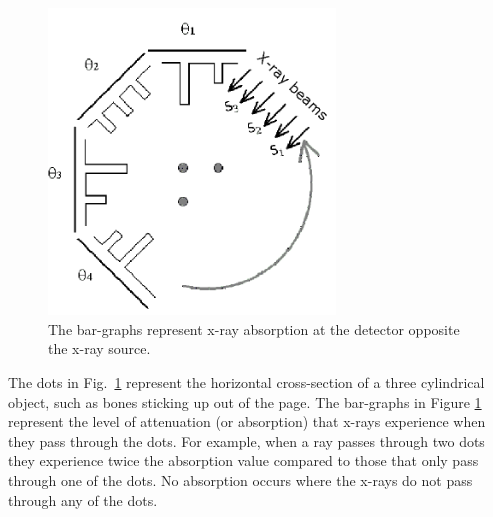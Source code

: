 \begin{figure}[!htb]
	\centering
	\includegraphics[width=3.0in]{./figures/Topic10/Fig10-10.png}
	\caption{The bar-graphs represent x-ray absorption at the detector opposite the x-ray source.}
	\label{Fig10-10}
\end{figure}
The dots in Fig.~\ref{Fig10-10} represent the horizontal cross-section of a three cylindrical object, such as bones sticking up out of the page. The bar-graphs in Figure \ref{Fig10-10} represent the level of attenuation (or absorption) that x-rays experience when they pass through the dots. For example, when a ray passes through two dots they experience twice the absorption value compared to those that only pass through one of the dots.  No absorption occurs where the x-rays do not pass through any of the dots.
  
